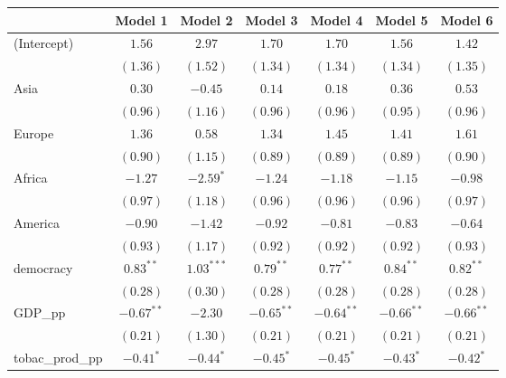 
\begin{table}[!h]
\begin{center}
\begin{tabular}{l c c c c c c }
\toprule
 & Model 1 & Model 2 & Model 3 & Model 4 & Model 5 & Model 6 \\
\midrule
(Intercept)             & $1.56$       & $2.97$       & $1.70$       & $1.70$       & $1.56$       & $1.42$       \\
                        & $(1.36)$     & $(1.52)$     & $(1.34)$     & $(1.34)$     & $(1.34)$     & $(1.35)$     \\
Asia                    & $0.30$       & $-0.45$      & $0.14$       & $0.18$       & $0.36$       & $0.53$       \\
                        & $(0.96)$     & $(1.16)$     & $(0.96)$     & $(0.96)$     & $(0.95)$     & $(0.96)$     \\
Europe                  & $1.36$       & $0.58$       & $1.34$       & $1.45$       & $1.41$       & $1.61$       \\
                        & $(0.90)$     & $(1.15)$     & $(0.89)$     & $(0.89)$     & $(0.89)$     & $(0.90)$     \\
Africa                  & $-1.27$      & $-2.59^{*}$  & $-1.24$      & $-1.18$      & $-1.15$      & $-0.98$      \\
                        & $(0.97)$     & $(1.18)$     & $(0.96)$     & $(0.96)$     & $(0.96)$     & $(0.97)$     \\
America                 & $-0.90$      & $-1.42$      & $-0.92$      & $-0.81$      & $-0.83$      & $-0.64$      \\
                        & $(0.93)$     & $(1.17)$     & $(0.92)$     & $(0.92)$     & $(0.92)$     & $(0.93)$     \\
democracy               & $0.83^{**}$  & $1.03^{***}$ & $0.79^{**}$  & $0.77^{**}$  & $0.84^{**}$  & $0.82^{**}$  \\
                        & $(0.28)$     & $(0.30)$     & $(0.28)$     & $(0.28)$     & $(0.28)$     & $(0.28)$     \\
GDP\_pp                 & $-0.67^{**}$ & $-2.30$      & $-0.65^{**}$ & $-0.64^{**}$ & $-0.66^{**}$ & $-0.66^{**}$ \\
                        & $(0.21)$     & $(1.30)$     & $(0.21)$     & $(0.21)$     & $(0.21)$     & $(0.21)$     \\
tobac\_prod\_pp         & $-0.41^{*}$  & $-0.44^{*}$  & $-0.45^{*}$  & $-0.45^{*}$  & $-0.43^{*}$  & $-0.42^{*}$  \\

\end{tabular}
\end{center}
\end{table}

